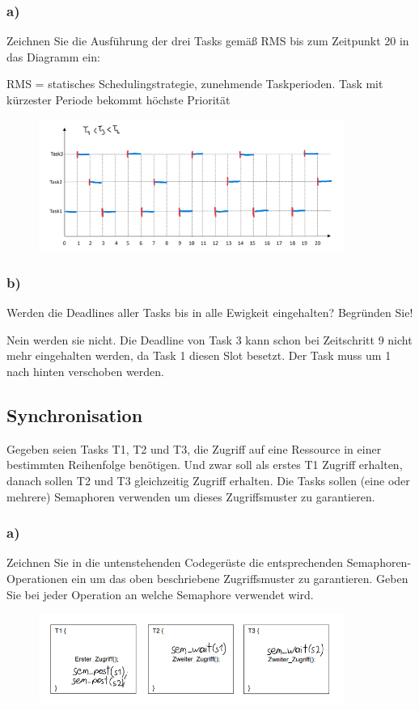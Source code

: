 \subsubsection{a)}
Zeichnen Sie die Ausführung der drei Tasks gemäß RMS bis zum Zeitpunkt 20 in das Diagramm ein:

RMS = statisches Schedulingstrategie, zunehmende Taskperioden. Task mit kürzester Periode bekommt höchste Priorität
\begin{figure}
  \includegraphics[width=10cm]{images/KA020222/2a.PNG}
  \centering
\end{figure}
\subsubsection{b)}
Werden die Deadlines aller Tasks bis in alle Ewigkeit eingehalten? Begründen Sie!

Nein werden sie nicht. Die Deadline von Task 3 kann schon bei Zeitschritt 9 nicht mehr eingehalten werden, da 
Task 1 diesen Slot besetzt. Der Task muss um 1 nach hinten verschoben werden. 

\subsection{Synchronisation}
Gegeben seien Tasks T1, T2 und T3, die Zugriff auf eine Ressource in einer bestimmten Reihenfolge
benötigen. Und zwar soll als erstes T1 Zugriff erhalten, danach sollen T2 und T3 gleichzeitig Zugriff erhalten.
Die Tasks sollen (eine oder mehrere) Semaphoren verwenden um dieses Zugriffsmuster zu garantieren.

\subsubsection{a)}
Zeichnen Sie in die untenstehenden Codegerüste die entsprechenden Semaphoren-Operationen ein
um das oben beschriebene Zugriffsmuster zu garantieren. Geben Sie bei jeder Operation an welche
Semaphore verwendet wird.
\begin{figure}
  \includegraphics[width=10cm]{images/KA020222/4a.PNG}
  \centering
\end{figure}

